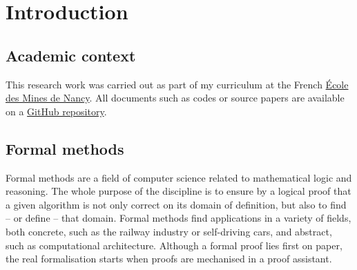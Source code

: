 \documentclass[a4 paper, 12pt]{article}
\theoremstyle{definition}
\begin{document}
\section{Introduction}
\subsection{Academic context}
This research work was carried out as part of my curriculum at the French \href{https://mines-nancy.univ-lorraine.fr}{École des Mines de Nancy}. All documents such as codes or source papers are available on a \href{https://github.com/VTrelat/Tarjan}{GitHub repository}.

\subsection{Formal methods}
Formal methods are a field of computer science related to mathematical logic and reasoning. The whole purpose of the discipline is to ensure by a logical proof that a given algorithm is not only correct on its domain of definition, but also to find -- or define -- that domain. Formal methods find applications in a variety of fields, both concrete, such as the railway industry or self-driving cars, and abstract, such as computational architecture.
\BlankLine
Although a formal proof lies first on paper, the real formalisation starts when proofs are mechanised in a proof assistant.

\end{document}
